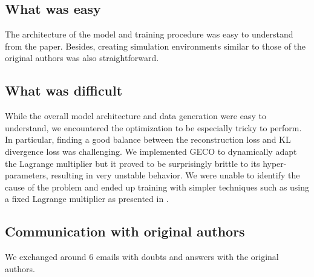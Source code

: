 \subsection*{What was easy}
The architecture of the model and training procedure was easy to understand from the paper.
Besides, creating simulation environments similar to those of the original authors was also straightforward. 

\subsection*{What was difficult}
While the overall model architecture and data generation were easy to understand, we encountered the optimization to be especially tricky to perform.
In particular, finding a good balance between the reconstruction loss and KL divergence loss was challenging.
We implemented GECO \cite{geco} to dynamically adapt the Lagrange multiplier but it proved to be surprisingly brittle to its hyper-parameters, resulting in very unstable behavior.
We were unable to identify the cause of the problem and ended up training with simpler techniques such as using a fixed Lagrange multiplier as presented in \cite{beta-vae}.

\subsection*{Communication with original authors}
We exchanged around 6 emails with doubts and answers with the original authors.


\newpage










